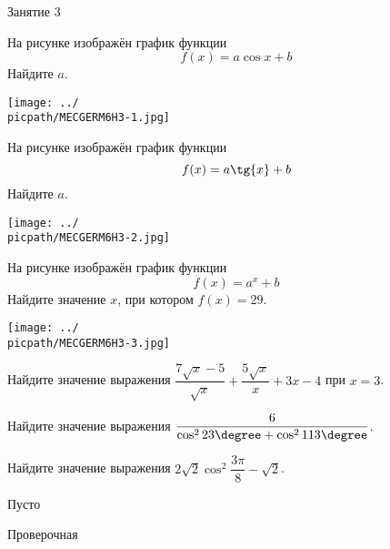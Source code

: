 \begin{class}[number=3]
	\begin{listofex}
		\item Занятие 3
	\end{listofex}
\end{class}

\begin{homework}[number=3]
	\begin{listofex}
		\item
		\begin{minipage}[t]{\bodywidth}
			На рисунке изображён график функции \[ f(x)=a \cos{x}+b \] Найдите \(a\).
		\end{minipage}
		\hspace{0.02\linewidth}
		\begin{minipage}[t]{\picwidth}
			\texttt{[image: ../\\picpath/MECGERM6H3-1.jpg]}
		\end{minipage}
		\item
		\begin{minipage}[t]{\bodywidth}
			На рисунке изображён график функции \[ f(x)=a \tg{x}+b \] Найдите \(a\).
		\end{minipage}
		\hspace{0.02\linewidth}
		\begin{minipage}[t]{\picwidth}
			\texttt{[image: ../\\picpath/MECGERM6H3-2.jpg]}
		\end{minipage}
		\item
		\begin{minipage}[t]{\bodywidth}
			На рисунке изображён график функции \[ f(x)=a^x+b \] Найдите значение \(x\), при котором \( f(x)=29 \).
		\end{minipage}
		\hspace{0.02\linewidth}
		\begin{minipage}[t]{\picwidth}
			\texttt{[image: ../\\picpath/MECGERM6H3-3.jpg]}
		\end{minipage}
		\item Найдите значение выражения \( \dfrac{7\sqrt{x}-5}{\sqrt{x}}+\dfrac{5\sqrt{x}}{x}+3x-4 \) при \( x=3 \).
		\item Найдите значение выражения \( \dfrac{6}{\cos^2{23\degree}+\cos^2{113\degree}} \).
		\item Найдите значение выражения \( 2\sqrt{2}\cos^2{\dfrac{3\pi}{8}}-\sqrt{2} \).
	\end{listofex}
\end{homework}

\begin{class}[number=4]
	\begin{listofex}
		\item Пусто
	\end{listofex}
\end{class}


\begin{exam}
	\begin{listofex}
		\item Проверочная
	\end{listofex}
\end{exam}
